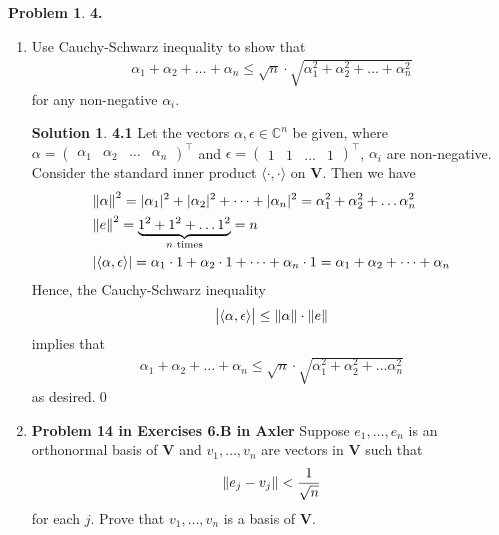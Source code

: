 \documentclass{article}
\theoremstyle{definition}
\newtheorem*{prob*}{Problem}
\newtheorem*{sln*}{Solution}
\newcommand{\V}{\mathbf{V}}
\newcommand{\la}{\langle}
\newcommand{\ra}{\rangle}
\begin{document}
\newpage





\begin{prob*}\textbf{4.}
	\begin{enumerate}
		\item Use Cauchy-Schwarz inequality to show that 
		\begin{align*}
		\alpha_1 + \alpha_2 + \dots + \alpha_n \leq 
		\sqrt{n}\cdot \sqrt{\alpha_1^2+ \alpha_2^2 + \dots + \alpha_n^2}
		\end{align*}
		for any non-negative $\alpha_i$.
		
		\begin{sln*}\textbf{4.1}
			Let the vectors $\alpha, \epsilon \in \mathbb{C}^n $ be given, where $\alpha = \begin{pmatrix}
			\alpha_1 & \alpha_2 & \dots & \alpha_n
			\end{pmatrix}^\top$ and $\epsilon = \begin{pmatrix}
			1 & 1 & \dots & 1
			\end{pmatrix}^\top$, $\alpha_i$ are non-negative. Consider the standard inner product $\la \cdot,\cdot \ra$ on $\V$. Then we have
			\begin{align*}
			&\norm{\alpha}^2 = \vert \alpha_1 \vert^2 + \vert \alpha_2 \vert^2 + \dots + \vert \alpha_n \vert^2 = \alpha_1^2 + \alpha_2^2 + \dots \alpha_n^2\\
			&\norm{e}^2  = \underbrace{1^2 + 1^2 + \dots 1^2}_{n \text{ times}} = n\\
			&\vert \la \alpha,\epsilon\ra\vert = \alpha_1 \cdot 1 +  \alpha_2 \cdot 1 +  \dots + \alpha_n \cdot 1 = \alpha_1 + \alpha_2 + \dots + \alpha_n 
			\end{align*} Hence, the Cauchy-Schwarz inequality
			\begin{align*}
			\big\vert \la \alpha , \epsilon \ra \big\vert \leq \norm{\alpha}\cdot \norm{e}
			\end{align*}
			implies that 
			\begin{align*}
			\alpha_1 + \alpha_2 + \dots + \alpha_n  \leq \sqrt{n}\cdot \sqrt{\alpha_1^2 + \alpha_2^2 + \dots \alpha_n^2}
			\end{align*}
			as desired.\qed
		\end{sln*}
		
		
		\newpage
		
		
		
		\item \textbf{Problem 14 in Exercises 6.B in Axler} Suppose $e_1,\dots,e_n$ is an orthonormal basis of $\V$ and $v_1,\dots,v_n$ are vectors in $\V$ such that
		\begin{align*}
		\norm{e_j - v_j } < \frac{1}{\sqrt{n}}
		\end{align*}
		for each $j$. Prove that $v_1,\dots,v_n$ is a basis of $\V$.
		

\end{enumerate}
\end{prob*}
\end{document}
